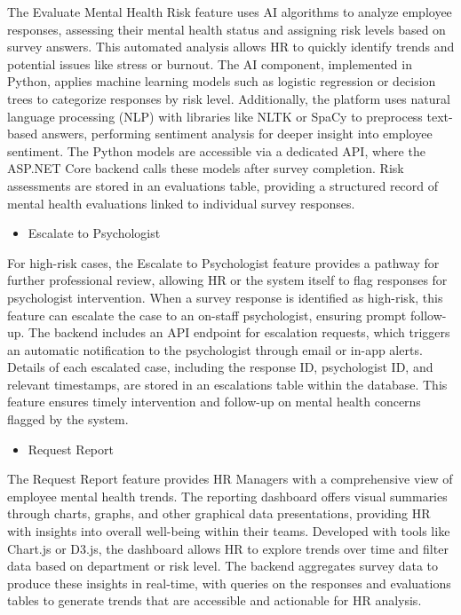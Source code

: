 \documentclass[conference]{IEEEtran}
\begin{document}
    The Evaluate Mental Health Risk feature uses AI algorithms to 
    analyze employee responses, assessing their mental health status 
    and assigning risk levels based on survey answers. This automated
     analysis allows HR to quickly identify trends and potential 
     issues like stress or burnout. The AI component, implemented 
     in Python, applies machine learning models such as logistic 
     regression or decision trees to categorize responses by risk 
     level. Additionally, the platform uses natural language 
     processing (NLP) with libraries like NLTK or SpaCy to preprocess 
     text-based answers, performing sentiment analysis for deeper 
     insight into employee sentiment. The Python models are 
     accessible via a dedicated API, where the ASP.NET Core 
     backend calls these models after survey completion. Risk 
     assessments are stored in an evaluations table, providing a 
     structured record of mental health evaluations linked to 
     individual survey responses.
     \newline    

     \begin{itemize}
        \item Escalate to Psychologist
    \end{itemize}
    
    For high-risk cases, the Escalate to Psychologist feature 
    provides a pathway for further professional review, allowing 
    HR or the system itself to flag responses for psychologist 
    intervention. When a survey response is identified as high-risk, 
    this feature can escalate the case to an on-staff psychologist,
    ensuring prompt follow-up. The backend includes an API endpoint 
    for escalation requests, which triggers an automatic 
    notification to the psychologist through email or in-app 
    alerts. Details of each escalated case, including the response
    ID, psychologist ID, and relevant timestamps, are stored in an
    escalations table within the database. This feature ensures 
    timely intervention and follow-up on mental health concerns
    flagged by the system.
    \newline    

     \begin{itemize}
        \item Request Report
    \end{itemize}
    

    The Request Report feature provides HR Managers with a 
    comprehensive view of employee mental health trends. The 
    reporting dashboard offers visual summaries through charts, 
    graphs, and other graphical data presentations, providing HR
     with insights into overall well-being within their teams. 
     Developed with tools like Chart.js or D3.js, the dashboard 
     allows HR to explore trends over time and filter data based 
     on department or risk level. The backend aggregates survey 
     data to produce these insights in real-time, with queries on 
     the responses and evaluations tables to generate trends that 
     are accessible and actionable for HR analysis.
     \newline    
\end{document}

